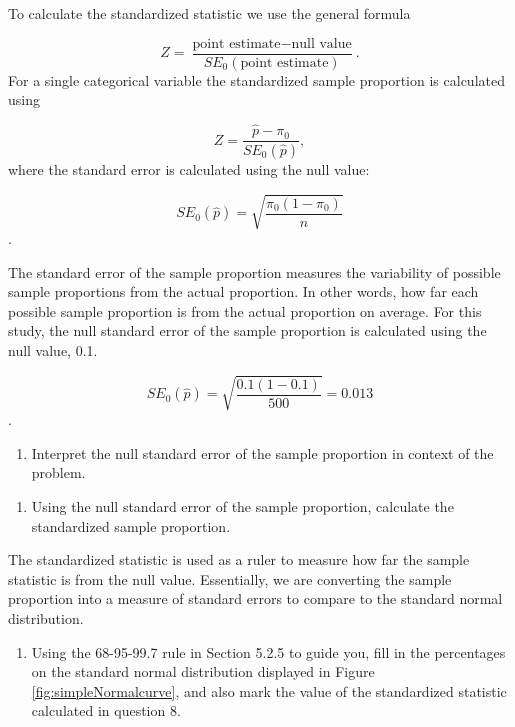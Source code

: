 \documentclass[
]{report}
\providecommand{\tightlist}{%
  \setlength{\itemsep}{0pt}\setlength{\parskip}{0pt}}
\begin{document}
\vspace{1in}
\newpage

To calculate the standardized statistic we use the general formula

\[
Z = \frac{\text{point estimate} - \text{null value}}{SE_0(\text{point estimate})}.
\]
For a single categorical variable the standardized sample proportion is calculated using

\[
Z = \frac{\hat{p} - \pi_0}{SE_0(\hat{p})},
\]
where the standard error is calculated using the null value:

\[SE_0(\hat{p})=\sqrt{\frac{\pi_0(1-\pi_0)}{n}}\].

The standard error of the sample proportion measures the variability of possible sample proportions from the actual proportion. In other words, how far each possible sample proportion is from the actual proportion on average. For this study, the null standard error of the sample proportion is calculated using the null value, 0.1.

\[SE_0(\hat{p})=\sqrt{\frac{0.1(1-0.1)}{500}} = 0.013\].

\begin{enumerate}
\def\labelenumi{\arabic{enumi}.}
\setcounter{enumi}{6}
\tightlist
\item
  Interpret the null standard error of the sample proportion in context of the problem.
\end{enumerate}

\vspace{0.6in}

\begin{enumerate}
\def\labelenumi{\arabic{enumi}.}
\setcounter{enumi}{7}
\tightlist
\item
  Using the null standard error of the sample proportion, calculate the standardized sample proportion.
\end{enumerate}

\vspace{0.6in}

The standardized statistic is used as a ruler to measure how far the sample statistic is from the null value. Essentially, we are converting the sample proportion into a measure of standard errors to compare to the standard normal distribution.

\begin{enumerate}
\def\labelenumi{\arabic{enumi}.}
\setcounter{enumi}{8}
\tightlist
\item
  Using the 68-95-99.7 rule in Section 5.2.5 to guide you, fill in the percentages on the standard normal distribution displayed in Figure \ref{fig:simpleNormalcurve}, and also mark the value of the standardized statistic calculated in question 8.
\end{enumerate}
\end{document}
